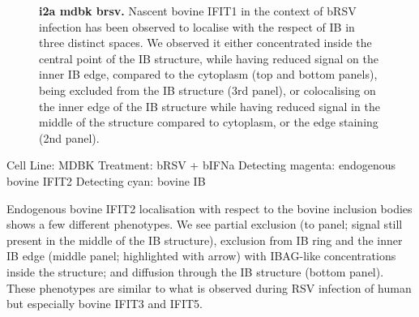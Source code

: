 \begin{figure}
\begin{subfigure}{1\textwidth}
    \end{subfigure}
    \caption[i2a mdbk brsv]{\textbf{i2a mdbk brsv.} Nascent bovine IFIT1 in the context of bRSV infection has been observed to localise with the respect of IB in three distinct spaces. We observed it either concentrated inside the central point of the IB structure, while having reduced signal on the inner IB edge, compared to the cytoplasm (top and bottom panels), being excluded from the IB structure (3rd panel), or colocalising on the inner edge of the IB structure while having reduced signal in the middle of the structure compared to cytoplasm, or the edge staining (2nd panel).}
    \label{fig:i2a mdbk brsv}
\end{figure}

Cell Line: MDBK \newline
Treatment: bRSV + bIFNa \newline
Detecting magenta: endogenous bovine IFIT2  \newline
Detecting cyan: bovine IB \newline

Endogenous bovine IFIT2 localisation with respect to the bovine inclusion bodies shows a few different phenotypes. We see partial exclusion (to panel; signal still present in the middle of the IB structure), exclusion from IB ring and the inner IB edge (middle panel; highlighted with arrow) with IBAG-like concentrations inside the structure; and diffusion through the IB structure (bottom panel). These phenotypes are similar to what is observed during RSV infection of human but especially bovine IFIT3 and IFIT5.

